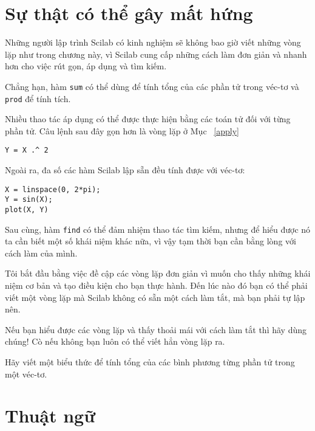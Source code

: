 \documentclass[12pt]{book}
\begin{document}
\section{Sự thật có thể gây mất hứng}

Những người lập trình Scilab có kinh nghiệm sẽ không bao giờ viết
những vòng lặp như trong chương này, vì Scilab cung cấp những cách
làm đơn giản và nhanh hơn cho việc rút gọn, áp dụng và tìm kiếm.

Chẳng hạn, hàm {\tt sum} có thể dùng để tính tổng của các phần tử
trong véc-tơ và {\tt prod} để tính tích.

Nhiều thao tác áp dụng có thể được thực hiện bằng các toán tử đối
với từng phần tử. Câu lệnh sau đây gọn hơn là vòng lặp ở 
Mục~ \ref{apply} 

\begin{verbatim}
Y = X .^ 2
\end{verbatim}

Ngoài ra, đa số các hàm Scilab lập sẵn đều tính được với véc-tơ:

\begin{verbatim}
X = linspace(0, 2*pi);
Y = sin(X);
plot(X, Y)
\end{verbatim}

Sau cùng, hàm {\tt find} có thể đảm nhiệm thao tác tìm kiếm, nhưng
để hiểu được nó ta cần biết một số khái niệm khác nữa, vì vậy tạm
thời bạn cần bằng lòng với cách làm của mình.

Tôi bắt đầu bằng việc đề cập các vòng lặp đơn giản vì muốn cho thấy
những khái niệm cơ bản và tạo điều kiện cho bạn thực hành. Đến lúc
nào đó bạn có thể phải viết một vòng lặp mà Scilab không có sẵn
một cách làm tắt, mà bạn phải tự lập nên.

Nếu bạn hiểu được các vòng lặp và thấy thoải mái với cách làm tắt
thì hãy dùng chúng! Cò nếu không bạn luôn có thể viết hẳn vòng lặp
ra.

\begin{ex}
Hãy viết một biểu thức để tính tổng của các bình phương từng phần tử
trong một véc-tơ.
\end{ex}


\section{Thuật ngữ}
\end{document}
